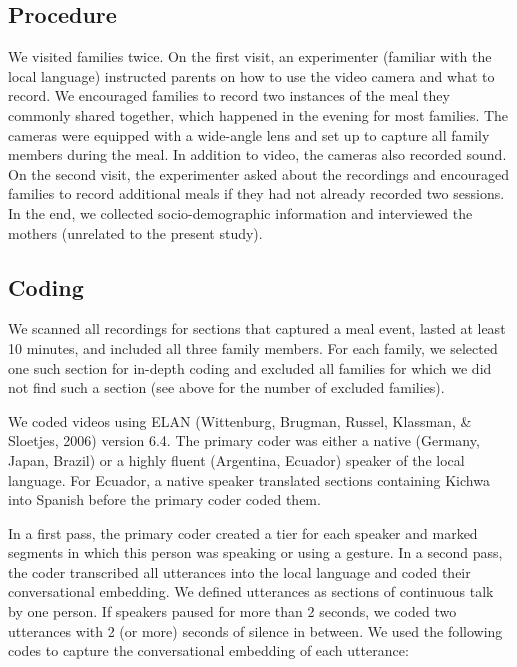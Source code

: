 \documentclass[
  man,floatsintext]{apa6}
\begin{document}
\hypertarget{procedure}{%
\subsection{Procedure}\label{procedure}}

We visited families twice. On the first visit, an experimenter (familiar with the local language) instructed parents on how to use the video camera and what to record. We encouraged families to record two instances of the meal they commonly shared together, which happened in the evening for most families. The cameras were equipped with a wide-angle lens and set up to capture all family members during the meal. In addition to video, the cameras also recorded sound. On the second visit, the experimenter asked about the recordings and encouraged families to record additional meals if they had not already recorded two sessions. In the end, we collected socio-demographic information and interviewed the mothers (unrelated to the present study).

\hypertarget{coding}{%
\subsection{Coding}\label{coding}}

We scanned all recordings for sections that captured a meal event, lasted at least 10 minutes, and included all three family members. For each family, we selected one such section for in-depth coding and excluded all families for which we did not find such a section (see above for the number of excluded families).

We coded videos using ELAN (Wittenburg, Brugman, Russel, Klassman, \& Sloetjes, 2006) version 6.4. The primary coder was either a native (Germany, Japan, Brazil) or a highly fluent (Argentina, Ecuador) speaker of the local language. For Ecuador, a native speaker translated sections containing Kichwa into Spanish before the primary coder coded them.

In a first pass, the primary coder created a tier for each speaker and marked segments in which this person was speaking or using a gesture. In a second pass, the coder transcribed all utterances into the local language and coded their conversational embedding. We defined utterances as sections of continuous talk by one person. If speakers paused for more than 2 seconds, we coded two utterances with 2 (or more) seconds of silence in between. We used the following codes to capture the conversational embedding of each utterance:
\end{document}
